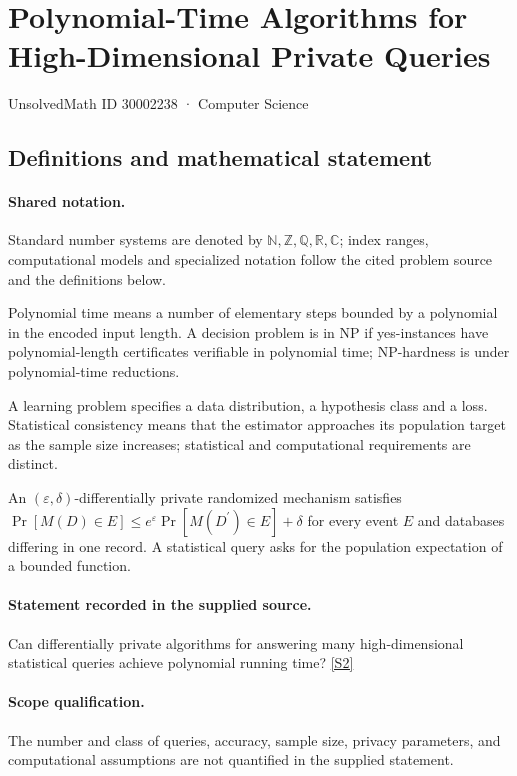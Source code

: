 \documentclass[11pt]{article}
\newcommand{\sref}[2]{\hyperlink{source:#1:#2}{[S#2]}}
\begin{document}
\setcounter{section}{30002237}
\section{Polynomial-Time Algorithms for High-Dimensional Private Queries}\label{30002238}
{\small\sffamily UnsolvedMath ID 30002238 · Computer Science}
\subsection{Definitions and mathematical statement}

\paragraph{Shared notation.}Standard number systems are denoted by $\mathbb N,\mathbb Z,\mathbb Q,\mathbb R,\mathbb C$; index ranges, computational models and specialized notation follow the cited problem source and the definitions below.


Polynomial time means a number of elementary steps bounded by a polynomial in the encoded input length. A decision problem is in $\mathrm{NP}$ if yes-instances have polynomial-length certificates verifiable in polynomial time; NP-hardness is under polynomial-time reductions.

A learning problem specifies a data distribution, a hypothesis class and a loss. Statistical consistency means that the estimator approaches its population target as the sample size increases; statistical and computational requirements are distinct.

An $(\varepsilon,\delta)$-differentially private randomized mechanism satisfies $\Pr[M(D)\in E]\leq e^\varepsilon\Pr[M(D^{\prime})\in E]+\delta$ for every event $E$ and databases differing in one record. A statistical query asks for the population expectation of a bounded function.
\paragraph{Statement recorded in the supplied source.}
Can differentially private algorithms for answering many high-dimensional statistical queries achieve polynomial running time? \sref{30002238}{2}
\paragraph{Scope qualification.}
The number and class of queries, accuracy, sample size, privacy parameters, and computational assumptions are not quantified in the supplied statement.
\end{document}
